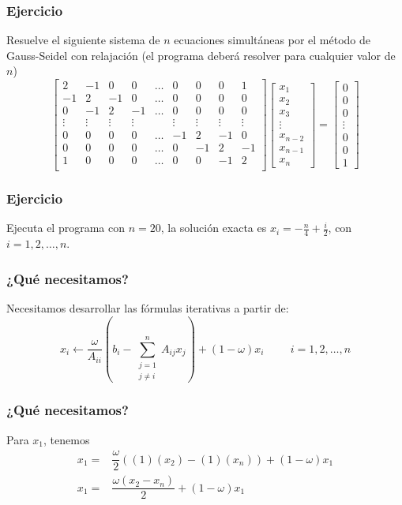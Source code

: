 \begin{frame}[plain]
\frametitle{Ejercicio}
Resuelve el siguiente sistema de $n$ ecuaciones simultáneas por el método de Gauss-Seidel con relajación (el programa deberá resolver para cualquier valor de $n$)
\fontsize{12}{12}\selectfont
\[ \begin{bmatrix}
2 & -1 & 0 & 0 & \ldots & 0 & 0 & 0 & 1 \\
-1 & 2 & -1 & 0 & \ldots & 0 & 0 & 0 & 0 \\
0 & -1 & 2 & -1 & \ldots & 0 & 0 & 0 & 0 \\
\vdots & \vdots & \vdots & \vdots & & \vdots & \vdots & \vdots & \vdots \\
0 & 0 & 0 & 0 & \ldots & -1 & 2 & -1 & 0 \\
0 & 0 & 0 & 0 & \ldots & 0 & -1 & 2 & -1 \\
1 & 0 & 0 & 0 & \ldots & 0 & 0 & -1 & 2 \\
\end{bmatrix}
\begin{bmatrix}
x_{1} \\
x_{2} \\
x_{3} \\
\vdots \\
x_{n-2} \\
x_{n-1} \\
x_{n} 
\end{bmatrix} = 
\begin{bmatrix}
0 \\
0 \\
0 \\
\vdots \\
0 \\
0 \\
1 
\end{bmatrix} \]
\end{frame}
\begin{frame}[plain]
\frametitle{Ejercicio}
Ejecuta el programa con $n=20$, la solución exacta es $x_{i}= - \frac{n}{4} + \frac{i}{2}$, con $i=1,2,\ldots,n$.
\end{frame}
\begin{frame}
\frametitle{¿Qué necesitamos?}
Necesitamos desarrollar las fórmulas iterativas a partir de:
\[  x_{i}\leftarrow \dfrac{\omega}{A_{ii}} \left( b_{i} - \sum_{\substack{ j=1 \\ j \neq i}}^{n} A_{ij} x_{j} \right) + (1 - \omega) x_{i} \hspace{1cm} i=1,2,\ldots,n \]
\end{frame}
\begin{frame}
\frametitle{¿Qué necesitamos?}
Para $x_{1}$, tenemos
\[ \begin{split}
x_{1} =& \dfrac{\omega}{2} \left( (1)(x_{2})-(1)(x_{n}) \right) + (1-\omega)x_{1} \\
x_{1} =& \dfrac{\omega(x_{2}-x_{n})}{2} + (1 - \omega)x_{1}
\end{split} \]
\end{frame}
